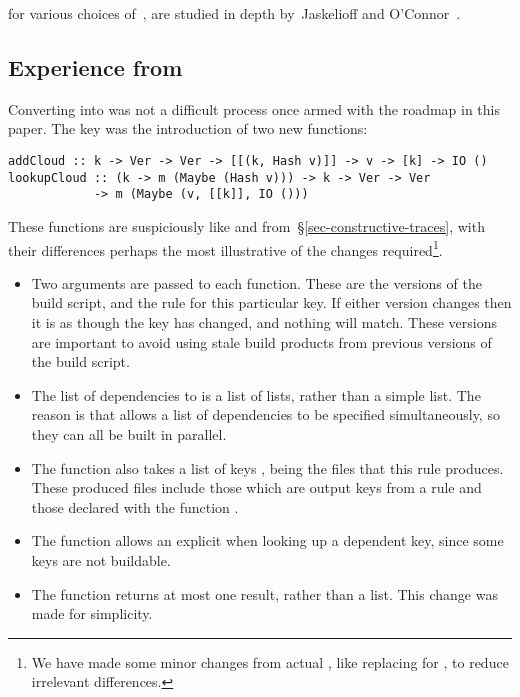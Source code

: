 \noindent for various choices of~, are studied in depth by~Jaskelioff and
O'Connor~.

\subsection{Experience from \Cloud \Shake}\label{sec-cloud-shake}

Converting \Shake into \Cloud \Shake was not a difficult process once armed with
the roadmap in this paper. The key was the introduction of two new
functions:

\vspace{1mm}
\begin{verbatim}
addCloud :: k -> Ver -> Ver -> [[(k, Hash v)]] -> v -> [k] -> IO ()
lookupCloud :: (k -> m (Maybe (Hash v))) -> k -> Ver -> Ver
            -> m (Maybe (v, [[k]], IO ()))
\end{verbatim}
\vspace{1mm}

\noindent
These functions are suspiciously like  and 
from~\S\ref{sec-constructive-traces}, with their differences perhaps the most
illustrative of the changes required\footnote{We have made some minor changes from
actual \Shake, like replacing  for , to reduce irrelevant
differences.}.

\begin{itemize}
\item Two  arguments are passed to each function. These are
      the versions of the build script, and the rule for this particular key. If
      either version changes then it is as though the key has changed, and
      nothing will match. These versions are important to avoid using stale
      build products from previous versions of the build script.
\item The list of dependencies to  is a list of lists, rather than
      a simple list. The reason is that \Shake allows a list of dependencies to
      be specified simultaneously, so they can all be built in parallel.
\item The  function also takes a list of keys \hs{[k]}, being the
      files that this rule produces. These produced files include those which
      are output keys from a rule and those declared with the function
      .
\item The  function allows an explicit  when looking
      up a dependent key, since some keys are not buildable.
\item The  function returns at most one result, rather than a
      list. This change was made for simplicity.
\end{itemize}

